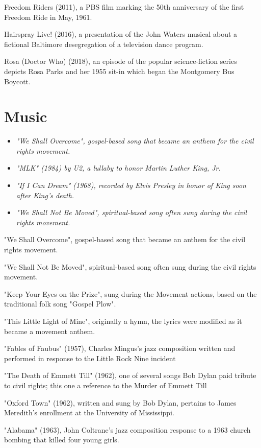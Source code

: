 Freedom Riders (2011), a PBS film marking the 50th anniversary of the
first Freedom Ride in May, 1961.

Hairspray Live! (2016), a presentation of the John Waters musical about
a fictional Baltimore desegregation of a television dance program.

Rosa (Doctor Who) (2018), an episode of the popular science-fiction
series depicts Rosa Parks and her 1955 sit-in which began the Montgomery
Bus Boycott.

\section{Music}\label{music}

\begin{itemize}
\item
  \emph{"We Shall Overcome", gospel-based song that became an anthem for
  the civil rights movement.}
\item
  \emph{"MLK" (1984) by U2, a lullaby to honor Martin Luther King, Jr.}
\item
  \emph{"If I Can Dream" (1968), recorded by Elvis Presley in honor of
  King soon after King's death.}
\item
  \emph{"We Shall Not Be Moved", spiritual-based song often sung during
  the civil rights movement.}
\end{itemize}

"We Shall Overcome", gospel-based song that became an anthem for the
civil rights movement.

"We Shall Not Be Moved", spiritual-based song often sung during the
civil rights movement.

"Keep Your Eyes on the Prize", sung during the Movement actions, based
on the traditional folk song "Gospel Plow".

"This Little Light of Mine", originally a hymn, the lyrics were modified
as it became a movement anthem.

"Fables of Faubus" (1957), Charles Mingus's jazz composition written and
performed in response to the Little Rock Nine incident

"The Death of Emmett Till" (1962), one of several songs Bob Dylan paid
tribute to civil rights; this one a reference to the Murder of Emmett
Till

"Oxford Town" (1962), written and sung by Bob Dylan, pertains to James
Meredith's enrollment at the University of Mississippi.

"Alabama" (1963), John Coltrane's jazz composition response to a 1963
church bombing that killed four young girls.

